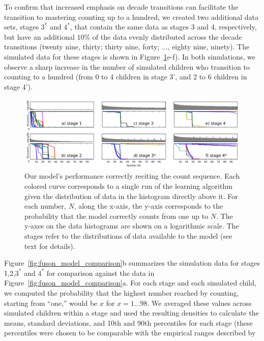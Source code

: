 \documentclass[10pt,letterpaper]{article}
\begin{document}
To confirm that increased emphasis on decade transitions can
facilitate the transition to mastering counting up to a hundred, we
created two additional data sets, stages $3^*$ and $4^*$, that contain the
same data as stages 3 and 4, respectively, but have an additional
$10\%$ of the data evenly distributed across the decade transitions
(twenty nine, thirty; thirty nine, forty; ..., eighty nine,
ninety). The simulated data for these stages is shown in
Figure~\ref{fig:counting_grid}e-f). In both simulations, we observe a
sharp increase in the number of simulated children who transition to
counting to a hundred (from 0 to 4 children in stage 3', and 2 to
6 children in stage 4').

\begin{figure}[t]
  \includegraphics[width=\linewidth]{figures/counting_grid2}
  \caption{Our model's performance correctly reciting the count
    sequence. Each colored curve corresponds to a single run of the learning
    algorithm given the distribution of data in the histogram directly
    above it. For each number, $N$, along the x-axis, the y-axis
    corresponds to the probability that the model correctly counts
    from one up to $N$. The y-axes on the data histograms are shown on
    a logarithmic scale. The stages refer to the distributions of data
    available to the model (see text for details).
  }\label{fig:counting_grid}
\end{figure}


Figure~\ref{fig:fuson_model_comparison}b summarizes the simulation
data for stages 1,2,$3^*$ and $4^*$ for comparison against the
\citeauthor{FusRicBriar1982} data in
Figure~\ref{fig:fuson_model_comparison}a. For each stage and each
simulated child, we computed the probability that the highest number
reached by counting, starting from ``one,'' would be $x$ for $x=1
\dots 98$. We averaged these values across simulated children within a
stage and used the resulting densities to calculate the means,
standard deviations, and 10th and 90th percentiles for each stage
(these percentiles were chosen to be comparable with the empirical
ranges described by \citeauthor{FusRicBriar1982}
\end{document}
